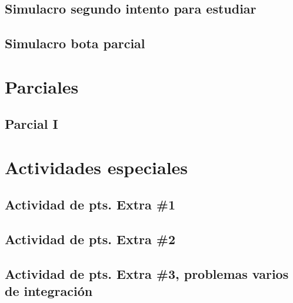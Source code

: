 \documentclass[openany]{book}
\begin{document}
\chapter{Simulacro segundo intento para estudiar}


\chapter{Simulacro bota parcial}




\part{Parciales}
\chapter{Parcial I}




\part{Actividades especiales}
\chapter{Actividad de pts. Extra \#1}


\chapter{Actividad de pts. Extra \#2}


\chapter{Actividad de pts. Extra \#3, problemas varios de integración}

\end{document}
